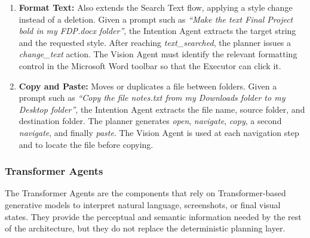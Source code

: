 \begin{enumerate}
  \item \textbf{Format Text:} Also extends the Search Text flow, applying a style change instead of a deletion. Given a prompt such as \textit{``Make the text Final Project bold in my FDP.docx folder''}, the Intention Agent extracts the target string and the requested style. After reaching \textit{text\_searched}, the planner issues a \textit{change\_text} action. The Vision Agent must identify the relevant formatting control in the Microsoft Word toolbar so that the Executor can click it.

  \item \textbf{Copy and Paste:} Moves or duplicates a file between folders. Given a prompt such as \textit{``Copy the file notes.txt from my Downloads folder to my Desktop folder''}, the Intention Agent extracts the file name, source folder, and destination folder. The planner generates \textit{open}, \textit{navigate}, \textit{copy}, a second \textit{navigate}, and finally \textit{paste}. The Vision Agent is used at each navigation step and to locate the file before copying.
\end{enumerate}

\subsubsection{Transformer Agents}

The Transformer Agents are the components that rely on Transformer-based generative models to interpret natural language, screenshots, or final visual states. They provide the perceptual and semantic information needed by the rest of the architecture, but they do not replace the deterministic planning layer.

